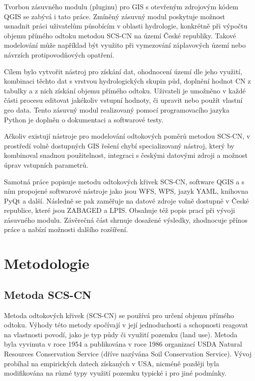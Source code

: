 \documentclass[a4paper,oneside,12pt]{book}
\begin{document}
Tvorbou zásuvného modulu (pluginu) pro GIS s otevřeným zdrojovým kódem QGIS se zabývá i tato práce. Zmíněný zásuvný modul poskytuje možnost usnadnit práci uživatelům působícím v oblasti hydrologie, konkrétně při výpočtu objemu přímého odtoku metodou SCS-CN na území České republiky. Takové modelování může například být využito při vymezování záplavových území nebo návrzích protipovodňových opatření.

Cílem bylo vytvořit nástroj pro získání dat, ohodnocení území dle jeho využití, kombinaci těchto dat s vrstvou hydrologických skupin půd, doplnění hodnot CN z tabulky a z nich získání objemu přímého odtoku. Uživateli je umožněno v každé části procesu editovat jakékoliv vstupní hodnoty, či upravit nebo použít vlastní geo data. Tento zásuvný modul realizovaný pomocí programovacího jazyka Python je doplněn o dokumentaci a softwarové testy. 

Ačkoliv existují nástroje pro modelování odtokových poměrů metodou SCS-CN, v prostředí volně dostupných GIS řešení chybí specializovaný nástroj, který by kombinoval snadnou použitelnost, integraci s českými datovými zdroji a možnost úprav vstupních parametrů.

Samotná práce popisuje metodu odtokových křivek SCS-CN, software QGIS a s ním propojené softwarové nástroje jako jsou WFS, WPS, jazyk YAML, knihovna PyQt a další. Následně se pak zaměřuje na  datové zdroje volně dostupně v České republice, které jsou ZABAGED a LPIS. Obsahuje též popis prací při vývoji zásuvného modulu. Závěrečná část shrnuje dosažené výsledky, zhodnocuje přínos práce a nabízí možnosti dalšího rozšíření.


\chapter{Metodologie}

\section{Metoda SCS-CN} \label{SCSCN}
\hspace{10mm} Metoda odtokových křivek (SCS-CN) se používá pro určení objemu přímého odtoku. Výhody této metody spočívají v její jednoduchosti a schopnosti reagovat na vlastnosti povodí, jako je typ půdy či využití pozemku (land use). Metoda byla vyvinuta v roce 1954 a publikována v roce 1986 organizací USDA Natural Resources Conservation Service (dříve nazývána Soil Conservation Service). \cite{MNYDGwleJOjKLRUp} Vývoj probíhal na empirických datech získaných v USA, nicméně později byla modifikována na různé typy využití pozemku typické i pro jiné podmínky. \cite{Holman2003}\cite{Lian2020}
\end{document}
